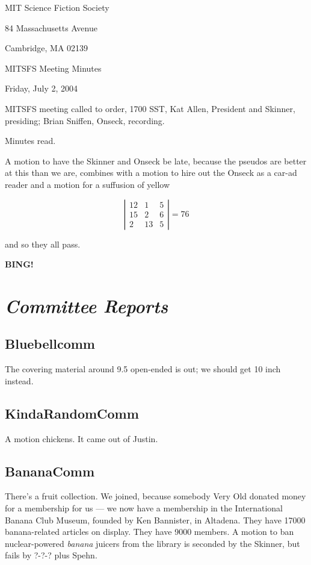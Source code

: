 \documentclass[10pt]{article}
\newcommand{\bing}{{\bf BING!} }
\newcommand{\goto}[1]{\bing \vskip 12pt \section*{{\em{#1}}}}
\newcommand{\ps}{ plus Spehn\xspace}
\begin{document}
\begin{center}

MIT Science Fiction Society 

84 Massachusetts Avenue

Cambridge, MA 02139

\vspace{12pt}

MITSFS Meeting Minutes 

Friday, July 2, 2004

\end{center}
 
\vspace{18pt}

\setlength{\parskip}{6pt}

\noindent
MITSFS meeting called to order, 1700 SST, Kat Allen, President and
Skinner, presiding; Brian Sniffen,  Onseck, recording.

Minutes read.

A motion to have the Skinner and Onseck be late, because the pseudos
are better at this than we are, combines with a motion to hire out the
Onseck as a car-ad reader and a motion for a suffusion of yellow

\[
\left|
\begin{array}{ccc}
12 & 1& 5\\ 
15 & 2& 6\\
2  &13& 5
\end{array}
\right|
= 76
\]

and so they all pass.

\goto{Committee Reports}
\subsection*{Bluebellcomm}
The covering material around 9.5 open-ended is out; we should get
10 inch instead.

\subsection*{KindaRandomComm}
A motion chickens.  It came out of Justin.

\subsection*{BananaComm}
There's a fruit collection.  We joined, because somebody Very Old
donated money for a membership for us --- we now have a membership in
the International Banana Club Museum, founded by Ken Bannister, in
Altadena.  They have 17000 banana-related articles on display.  They
have 9000 members.  A motion to ban nuclear-powered \emph{banana}
juicers from the library is seconded by the Skinner, but fails by ?-?-?\ps.
\end{document}
